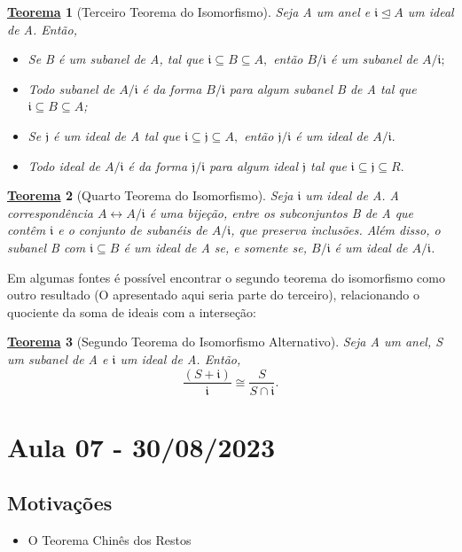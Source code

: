 \documentclass{article}
\newtheorem*{theorem*}{\underline{Teorema}}
\begin{document}
\begin{theorem*}[Terceiro Teorema do Isomorfismo]
  Seja A um anel e \(\mathfrak{i} \trianglelefteq{A}\) um ideal de A. Então, 
 \begin{itemize}
  \item[i)] Se B é um subanel de A, tal que \(\mathfrak{i}\subseteq B\subseteq A,\) então \(B/\mathfrak{i}\) é um
subanel de \(A/\mathfrak{i};\)
  \item[ii)] Todo subanel de \(A/\mathfrak{i}\) é da forma \(B/\mathfrak{i}\) para algum subanel B de A tal que
 \(\mathfrak{i} \subseteq B \subseteq A\);
  \item[iii)] Se \(\mathfrak{j}\) é um ideal de A tal que \(\mathfrak{i}\subseteq \mathfrak{j}\subseteq A,\) então
 \(\mathfrak{j}/\mathfrak{i}\) é um ideal de \(A/\mathfrak{i}.\)
  \item[iv)] Todo ideal de \(A/\mathfrak{i}\) é da forma \(\mathfrak{j}/\mathfrak{i}\) para algum ideal \(\mathfrak{j}\) tal que
 \(\mathfrak{i}\subseteq \mathfrak{j}\subseteq R.\) 
 \end{itemize}
\end{theorem*}
\begin{theorem*}[Quarto Teorema do Isomorfismo]
  Seja \(\mathfrak{i}\) um ideal de A. A correspondência \(A\longleftrightarrow A/\mathfrak{i}\) é uma bijeção, entre os subconjuntos B de A que contêm \(\mathfrak{i}\) e o 
conjunto de subanéis de \(A/\mathfrak{i}\), que preserva inclusões. Além disso, o subanel B com \(\mathfrak{i} \subseteq B\) é um ideal de A se, e somente se,
 \(B/\mathfrak{i}\) é um ideal de \(A/\mathfrak{i}\).
\end{theorem*}
  Em algumas fontes é possível encontrar o segundo teorema do isomorfismo como outro resultado (O apresentado aqui seria parte do terceiro), relacionando o quociente da soma de ideais
com a interseção:
\begin{theorem*}[Segundo Teorema do Isomorfismo Alternativo]
  Seja A um anel, S um subanel de A e \(\mathfrak{i}\) um ideal de A. Então, 
    \[
      \frac{(S+\mathfrak{i})}{\mathfrak{i}}\cong{\frac{S}{S\cap \mathfrak{i}}}.
    \]
\end{theorem*}
\newpage

\section{Aula 07 - 30/08/2023}
\subsection{Motivações}
\begin{itemize}
  \item O Teorema Chinês dos Restos
\end{itemize}
\end{document}
